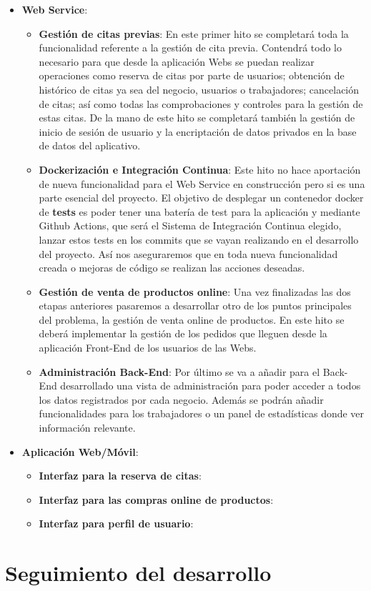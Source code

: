 \vspace{0.5em}
\begin{itemize}
    \item \textbf{Web Service}:
        \begin{itemize}
            \item \textbf{Gestión de citas previas}: En este primer hito se completará toda la funcionalidad referente
            a la gestión de cita previa. Contendrá todo lo necesario para que desde la aplicación Webs se puedan
            realizar operaciones como reserva de citas por parte de usuarios; obtención de histórico de citas ya
            sea del negocio, usuarios o trabajadores; cancelación de citas; así como todas las comprobaciones y
            controles para la gestión de estas citas. De la mano de este hito se completará también la gestión
            de inicio de sesión de usuario y la encriptación de datos privados en la base de datos del aplicativo.

            \item \textbf{Dockerización e Integración Continua}: Este hito no hace aportación de nueva funcionalidad
            para el Web Service en construcción pero si es una parte esencial del proyecto. El objetivo de desplegar un
            contenedor docker de \textbf{tests} es poder tener una batería de test para la aplicación y mediante
            Github Actions, que será el Sistema de Integración Continua elegido, lanzar estos tests en los commits
            que se vayan realizando en el desarrollo del proyecto. Así nos aseguraremos que en toda nueva funcionalidad
            creada o mejoras de código se realizan las acciones deseadas.

            \item \textbf{Gestión de venta de productos online}: Una vez finalizadas las dos etapas anteriores
            pasaremos a desarrollar otro de los puntos principales del problema, la gestión de venta online de
            productos. En este hito se deberá implementar la gestión de los pedidos que lleguen desde la aplicación
            Front-End de los usuarios de las Webs.

            \item \textbf{Administración Back-End}: Por último se va a añadir para el Back-End desarrollado una vista
            de administración para poder acceder a todos los datos registrados por cada negocio. Además se podrán
            añadir funcionalidades para los trabajadores o un panel de estadísticas donde ver información relevante.
        \end{itemize}
    \item \textbf{Aplicación Web/Móvil}:
    \begin{itemize}
                \item \textbf{Interfaz para la reserva de citas}:

                \item \textbf{Interfaz para las compras online de productos}:

                \item \textbf{Interfaz para perfil de usuario}:
            \end{itemize}
\end{itemize}
\section{Seguimiento del desarrollo}
